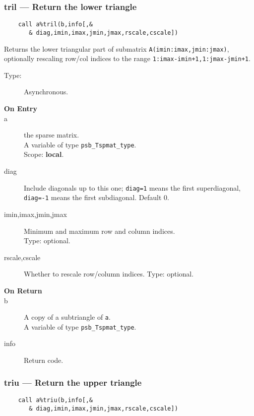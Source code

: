 \subsubsection*{tril --- Return the lower triangle}
\begin{verbatim}
    call a%tril(b,info[,&
       & diag,imin,imax,jmin,jmax,rscale,cscale])
\end{verbatim}

Returns the lower triangular part of submatrix
\verb|A(imin:imax,jmin:jmax)|, optionally rescaling row/col indices to
the range \verb|1:imax-imin+1,1:jmax-jmin+1|.   
\begin{description}
\item[Type:] Asynchronous.
\item[\bf On Entry]
\item[a] the sparse matrix.\\
A variable of type \verb|psb_Tspmat_type|.\\
Scope: {\bf local}.\\
\item[diag] Include diagonals up to this one; \verb|diag=1| means the
  first superdiagonal, \verb|diag=-1| means the first subdiagonal. 
Default 0.
\item[imin,imax,jmin,jmax] Minimum and maximum row and column indices.\\
Type: optional.
\item[rscale,cscale] Whether to rescale row/column indices.
Type: optional.
\end{description}
\begin{description}
\item[\bf On Return]
\item[b] A copy  of a subtriangle of \verb|a|.\\
A variable of type \verb|psb_Tspmat_type|.
\item[info] Return code. 
\end{description}

\subsubsection*{triu --- Return the upper triangle}
\begin{verbatim}
    call a%triu(b,info[,&
       & diag,imin,imax,jmin,jmax,rscale,cscale])
\end{verbatim}

